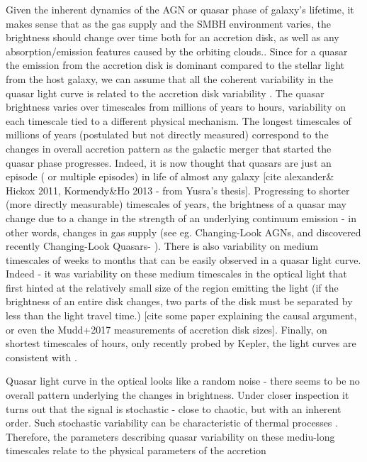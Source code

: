 \documentclass[modern]{aastex62}
\begin{document}
Given the inherent dynamics of the AGN or quasar phase of galaxy's lifetime, it makes sense that as the gas supply and the SMBH environment varies, the brightness should change over time both for an accretion disk, as well as any absorption/emission features caused by the orbiting clouds.\cite{stern2017, schawinski2015}.  Since for a quasar the emission from the accretion disk is dominant compared to the stellar light from the host galaxy, we can assume that all the coherent variability  in the quasar light curve is related to the accretion disk variability . The quasar brightness varies over timescales from millions of years to hours, variability on each timescale tied to a different physical mechanism.  The longest timescales of millions of years (postulated but not directly measured) correspond to the changes in overall accretion pattern as the galactic merger that started the quasar phase progresses.  Indeed, it is now thought that quasars are just an episode ( or multiple episodes) in life of almost any galaxy [cite alexander\& Hickox 2011, Kormendy\&Ho 2013 - from Yusra's thesis]. Progressing to shorter (more directly measurable) timescales of years, the brightness of a  quasar may change due to a change in the strength of an underlying continuum emission - in other words, changes in gas supply (see eg. Changing-Look AGNs, and discovered recently Changing-Look Quasars- \cite{ruan2016, macleod2016, graham2017}). There is also variability on medium timescales of weeks to months that can be easily observed in a quasar light curve. Indeed - it was variability on these medium timescales  in the optical light that first hinted at the relatively small size of the region emitting the light (if the brightness of an entire disk changes, two parts of the disk must be separated by less than the light travel time.) [cite some paper explaining the causal argument, or even the Mudd+2017 measurements of accretion disk sizes]. Finally, on shortest timescales of hours, only recently probed by Kepler, the light curves are consistent with  \citep{kasliwal2015a, aranzana2018, smith2018}.


Quasar light curve in the optical looks like a random noise - there seems to be no overall pattern underlying the changes in brightness. Under closer inspection it turns out that the signal is stochastic - close to chaotic, but with an inherent order. Such stochastic variability can be characteristic of thermal processes \citep{kelly2007, zu2013, kozlowski2016a}. Therefore, the parameters describing quasar variability on these mediu-long timescales relate to the physical parameters of the accretion 
\end{document}
